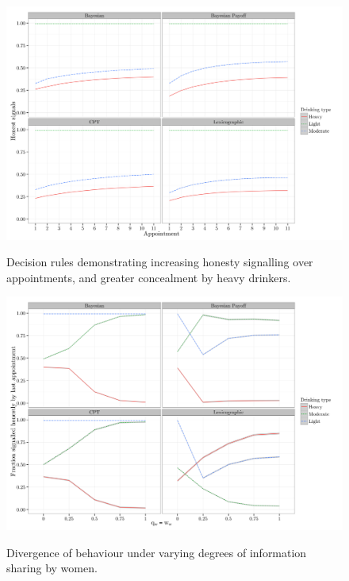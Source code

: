 \documentclass[twocolumn]{article}
\begin{document}
\begin{figure}[h!]{\includegraphics[width=\columnwidth]{honesty_plot}\label{fig_1}}
	\caption{Decision rules demonstrating increasing honesty signalling over appointments, and greater concealment by heavy drinkers.}
	\label{fig}
\end{figure}

\begin{figure}[h!]{\includegraphics[width=\columnwidth]{honesty_sharing}\label{fig_2}}
	\caption{Divergence of behaviour under varying degrees of information sharing by women.}
	\label{fig}
\end{figure}


\end{document}
